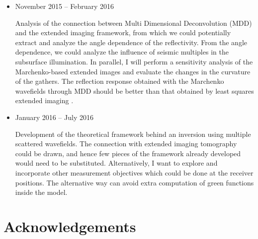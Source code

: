 \begin{itemize}
  \item November 2015 -- February 2016

        Analysis of the connection between Multi Dimensional Deconvolution (MDD) \citep{Wapenaar} and
        the extended imaging framework, from which we could potentially extract 
        and analyze the angle dependence of the reflectivity. From the angle 
        dependence, we could analyze the influence of seismic multiples in the 
        subsurface illumination.
        In parallel, I will perform a sensitivity analysis of the Marchenko-based 
        extended images and evaluate the changes in the curvature of the gathers. 
        The reflection response obtained with the Marchenko wavefields through 
        MDD should be better than that obtained by least squares extended imaging 
        \citep{GPR:GPR698}. 

  \item January 2016 -- July 2016 

        Development of the theoretical framework behind an inversion using 
        multiple scattered wavefields. The connection with extended imaging tomography could 
        be drawn, and hence few pieces of the framework already developed \citep{diaz2013data,diaz2015} 
        would need to be substituted. Alternatively, I want to
        explore and incorporate other measurement objectives which could 
        be done at the receiver positions. The alternative way can avoid
        extra computation of green functions inside the model. 

\end{itemize}


\section{Acknowledgements} 





